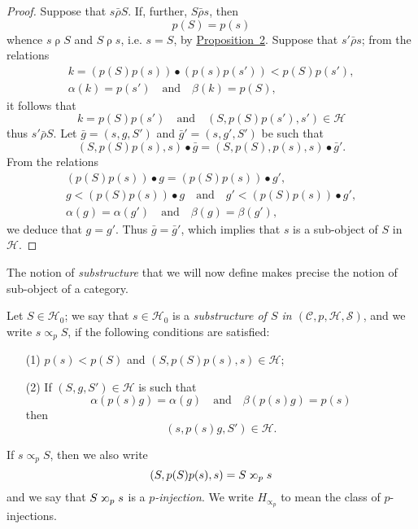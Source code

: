 \documentclass[a4paper,fleqn]{article}
\theoremstyle{plain}
\theoremstyle{definition}
\newenvironment{definition}[1]
  {\renewcommand\theinnerdefinition{#1}\innerdefinition}
  {\endinnerdefinition}
\newcommand{\oldpage}[1]{{\marginpar{\footnotesize$\bigg\vert$\,\,\,\,\textit{p.~#1}}}}
\newcommand{\textand}{\quad\text{and}\quad}
\newcommand{\CC}{\mathcal{C}}
\newcommand{\HH}{\mathcal{H}}
\renewcommand{\SS}{\mathcal{S}}
\newcommand{\relrho}{\mathrel{\rho}}
\newcommand{\relrhobar}{\mathrel{\bar{\rho}}}
\newcommand{\subs}{\mathrel{\propto}}
\newcommand{\sups}{\mathrel{\reflectbox{$\propto$}}}
\begin{document}
\begin{proof}
  Suppose that $s\relrhobar S$.
  If, further, $S\relrhobar s$, then
  \[
    p(S)=p(s)
  \]
  whence $s\relrho S$ and $S\relrho s$, i.e. $s=S$, by \hyperref[Proposition~2]{Proposition~2}.
  Suppose that $s'\relrhobar s$;
  from the relations
  \[
    \begin{gathered}
      k = (p(S)p(s))\bullet(p(s)p(s'))
      < p(S)p(s'),
    \\\alpha(k)=p(s')
      \textand
      \beta(k)=p(S),
    \end{gathered}
  \]
  it follows that
  \[
    k=p(S)p(s')
    \textand
    (S,p(S)p(s'),s')\in\HH
  \]
  thus $s'\relrhobar S$.
  \oldpage{360}
  Let $\bar{g}=(s,g,S')$ and $\bar{g}'=(s,g',S')$ be such that
  \[
    (S,p(S)p(s),s)\bullet\bar{g}
    = (S,p(S),p(s),s)\bullet\bar{g}'.
  \]
  From the relations
  \[
    \begin{gathered}
      (p(S)p(s))\bullet g = (p(S)p(s))\bullet g',
    \\g < (p(S)p(s))\bullet g
      \textand
      g' < (p(S)p(s))\bullet g',
    \\\alpha(g)=\alpha(g')
      \textand
      \beta(g)=\beta(g'),
    \end{gathered}
  \]
  we deduce that $g=g'$.
  Thus $\bar{g}=\bar{g}'$, which implies that $s$ is a sub-object of $S$ in $\HH$.
\end{proof}

The notion of \emph{substructure} that we will now define makes precise the notion of sub-object of a category.

\begin{definition}{7}
\label{definition:i-7}
  Let $S\in\HH_0$;
  we say that $s\in\HH_0$ is a \emph{substructure of $S$ in $(\CC,p,\HH,\SS)$}, and we write $s\subs_p S$, if the following conditions are satisfied:
  \begin{enumerate}
    \item[\normalfont(1)]
      $p(s)<p(S)$ and $(S,p(S)p(s),s)\in\HH$;
    \item[\normalfont(2)]
      If $(S,g,S')\in\HH$ is such that
      \[
        \alpha(p(s)g)=\alpha(g)
        \textand
        \beta(p(s)g)=p(s)
      \]
      then
      \[
        (s,p(s)g,S')\in\HH.
      \]
  \end{enumerate}
  If $s\subs_pS$, then we also write
  \[
    (S,p(S)p(s),s)
    = S\sups_p s
  \]
  and we say that $S\sups_p s$ is a \emph{$p$-injection}.
  We write $H_{\subs_p}$ to mean the class of $p$-injections.
\end{definition}
\end{document}
